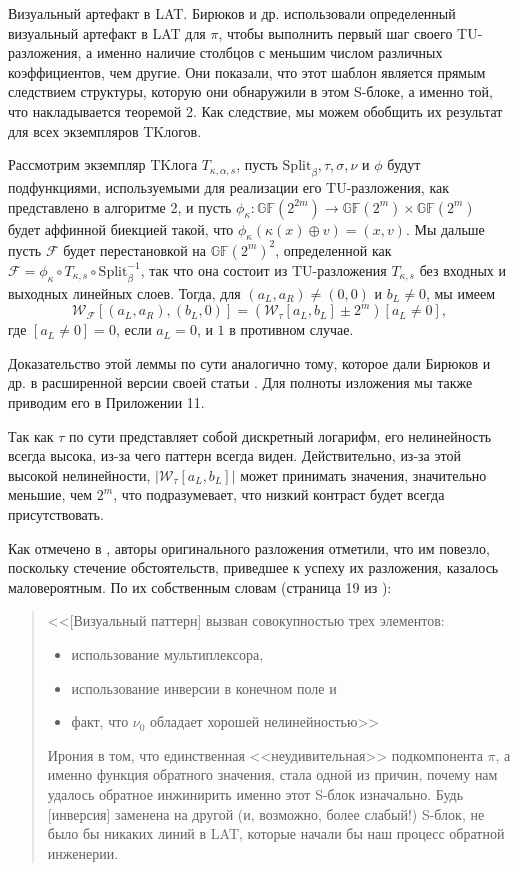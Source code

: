 Визуальный артефакт в LAT. Бирюков и др. использовали определенный визуальный артефакт в LAT для \(\pi\), чтобы выполнить первый шаг своего TU-разложения, а именно наличие столбцов с меньшим числом различных коэффициентов, чем другие. Они показали, что этот шаблон является прямым следствием структуры, которую они обнаружили в этом S-блоке, а именно той, что накладывается теоремой 2. Как следствие, мы можем обобщить их результат для всех экземпляров TKлогов.

\begin{lemma}
Рассмотрим экземпляр TKлога \(T_{\kappa,\alpha,s}\), пусть \(\text{Split}_{\beta}, \tau, \sigma, \nu\) и \(\phi\) будут подфункциями, используемыми для реализации его TU-разложения, как представлено в алгоритме 2, и пусть \(\phi_{\kappa} : \mathbb{GF}(2^{2m}) \to \mathbb{GF}(2^m) \times \mathbb{GF}(2^m)\) будет аффинной биекцией такой, что \(\phi_{\kappa}(\kappa(x) \oplus v) = (x, v)\). Мы дальше пусть \(\mathcal{F}\) будет перестановкой на \(\mathbb{GF} (2^m)^2\), определенной как \(\mathcal{F} = \phi_{\kappa} \circ T_{\kappa,s} \circ \text{Split}^{-1}_{\beta}\), так что она состоит из TU-разложения \(T_{\kappa,s}\) без входных и выходных линейных слоев. Тогда, для \((a_L, a_R) \neq (0, 0)\) и \(b_L \neq 0\), мы имеем
\[
\mathcal{W}_{\mathcal{F}}[(a_L, a_R), (b_L, 0)] = \left(\mathcal{W}_{\tau}[a_L, b_L] \pm 2^m\right)[a_L \neq 0],
\]
где \([a_L \neq 0] = 0\), если \(a_L = 0\), и \(1\) в противном случае.
\end{lemma}

Доказательство этой леммы по сути аналогично тому, которое дали Бирюков и др. в расширенной версии своей статьи \cite{BPU16b}. Для полноты изложения мы также приводим его в Приложении 11. 

Так как \(\tau\) по сути представляет собой дискретный логарифм, его нелинейность всегда высока, из-за чего паттерн всегда виден. Действительно, из-за этой высокой нелинейности, \(|\mathcal{W}_{\tau}[a_L, b_L]|\) может принимать значения, значительно меньшие, чем \(2^m\), что подразумевает, что низкий контраст будет всегда присутствовать.

Как отмечено в \cite{BPU16a}, авторы оригинального разложения отметили, что им повезло, поскольку стечение обстоятельств, приведшее к успеху их разложения, казалось маловероятным. По их собственным словам (страница 19 из \cite{BPU16b}):
\begin{quote}
<<[Визуальный паттерн] вызван совокупностью трех элементов:
\begin{itemize}
\item использование мультиплексора,
\item использование инверсии в конечном поле и
\item факт, что \(\nu_0\) обладает хорошей нелинейностью>>
\end{itemize}
Ирония в том, что единственная <<неудивительная>> подкомпонента \(\pi\), а именно функция обратного значения, стала одной из причин, почему нам удалось обратное инжинирить именно этот S-блок изначально. Будь [инверсия] заменена на другой (и, возможно, более слабый!) S-блок, не было бы никаких линий в LAT, которые начали бы наш процесс обратной инженерии.
\end{quote}

